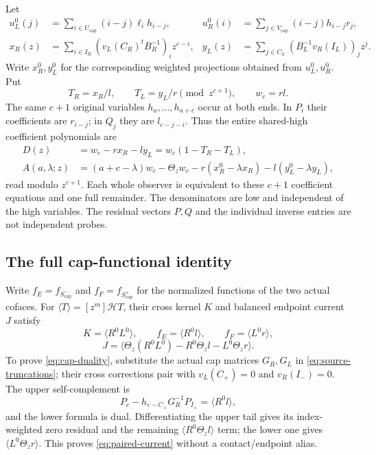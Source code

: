 \documentclass[11pt,a4paper]{amsart}
\numberwithin{equation}{section}
\theoremstyle{plain}
\theoremstyle{definition}
\newcommand{\sminus}{S^{-}_{\mathrm{cap}}}
\newcommand{\splus}{S^{+}_{\mathrm{cap}}}
\begin{document}
Let
\begin{align*}
 u_L^0(j)&=\sum_{i\in U_{\mathrm{cap}}}(i-j)\ell_i h_{i-j},&
 u_R^0(i)&=\sum_{j\in V_{\mathrm{cap}}}(i-j)h_{i-j}r_j,\\
 x_R(z)&=\sum_{i\in I_R}(v_L(C_R)^tB_R^{-1})_iz^{c-i},&
 y_L(z)&=\sum_{j\in C_L}(B_L^{-1}v_R(I_L))_jz^j.
\end{align*}
Write \(x_R^0,y_L^0\) for the corresponding weighted projections obtained from \(u_L^0,u_R^0\).  Put
\[
 T_R=x_R/l,\qquad T_L=y_L/r\pmod {z^{c+1}},\qquad w_c=rl.
\]
The same \(c+1\) original variables \(h_a,\ldots,h_{a+c}\) occur at both ends.  In \(P_i\) their coefficients are \(r_{i-j}\); in \(Q_j\) they are \(l_{c-j-i}\).  Thus the entire shared-high coefficient polynomials are
\begin{equation}\label{eq:cap-high}
\begin{split}
 D(z)&=w_c-rx_R-ly_L=w_c(1-T_R-T_L),\\
 A(a,\lambda;z)&=(a+c-\lambda)w_c-\Theta_z w_c
 -r(x_R^0-\lambda x_R)-l(y_L^0-\lambda y_L),
\end{split}
\end{equation}
read modulo \(z^{c+1}\).  Each whole observer is equivalent to these \(c+1\) coefficient equations and one full remainder.  The denominators are low and independent of the high variables.  The residual vectors \(P,Q\) and the individual inverse entries are not independent probes.

\subsection{The full cap-functional identity}
Write \(f_E=f_{\sminus}\) and \(f_F=f_{\splus}\) for the normalized functions of the two actual cofaces.  For \(\langle T\rangle=[z^m]\mathcal H T\), their cross kernel \(K\) and balanced endpoint current \(J\) satisfy
\begin{equation}\label{eq:cap-duality}
 K=\langle R^0L^0\rangle,\qquad f_E=\langle R^0l\rangle,
 \qquad f_F=\langle L^0r\rangle,
\end{equation}
\begin{equation}\label{eq:paired-current}
 J=\langle\Theta_z(R^0L^0)-R^0\Theta_z l-L^0\Theta_z r\rangle.
\end{equation}
To prove \eqref{eq:cap-duality}, substitute the actual cap matrices \(G_R,G_L\) in \eqref{eq:source-truncations}; their cross corrections pair with \(v_L(C_+)=0\) and \(v_R(I_-)=0\).  The upper self-complement is
\[
 P_c-h_{c-C_+}G_R^{-1}P_{I_+}=\langle R^0l\rangle,
\]
and the lower formula is dual.  Differentiating the upper tail gives its index-weighted zero residual and the remaining \(\langle R^0\Theta_z l\rangle\) term; the lower one gives \(\langle L^0\Theta_z r\rangle\).  This proves \eqref{eq:paired-current} without a contact/endpoint alias.
\end{document}
